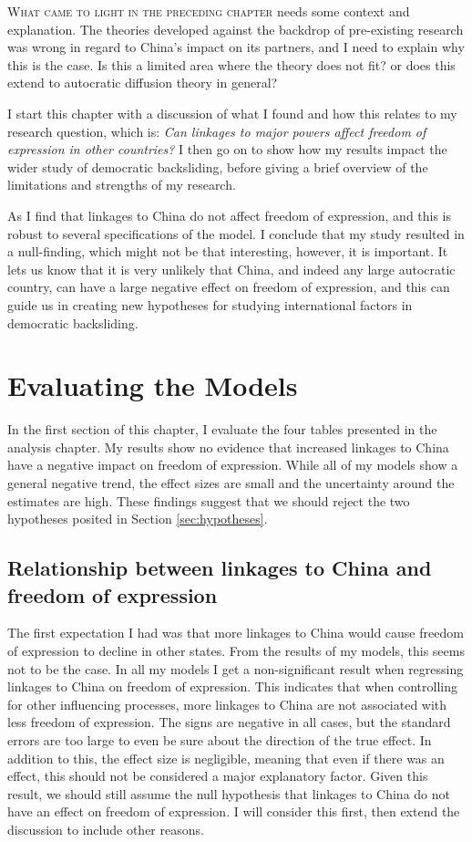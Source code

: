 \lettrine{W}{hat came to light in the preceding chapter} needs some context and explanation. The theories developed against the backdrop of pre-existing research was wrong in regard to China's impact on its partners, and I need to explain why this is the case. Is this a limited area where the theory does not fit? or does this extend to autocratic diffusion theory in general?

I start this chapter with a discussion of what I found and how this relates to my research question, which is: \textit{Can linkages to major powers affect freedom of expression in other countries?} I then go on to show how my results impact the wider study of democratic backsliding, before giving a brief overview of the limitations and strengths of my research. 

As I find that linkages to China do not affect freedom of expression, and this is robust to several specifications of the model. I conclude that my study resulted in a null-finding, which might not be that interesting, however, it is important. It lets us know that it is very unlikely that China, and indeed any large autocratic country, can have a large negative effect on freedom of expression, and this can guide us in creating new hypotheses for studying international factors in democratic backsliding. 

\section{Evaluating the Models}
In the first section of this chapter, I evaluate the four tables presented in the analysis chapter. My results show no evidence that increased linkages to China have a negative impact on freedom of expression. While all of my models show a general negative trend, the effect sizes are small and the uncertainty around the estimates are high. These findings suggest that we should reject the two hypotheses posited in Section \ref{sec:hypotheses}.

\subsection{Relationship between linkages to China and freedom of expression}
The first expectation I had was that more linkages to China would cause freedom of expression to decline in other states. From the results of my models, this seems not to be the case. In all my models  I get a non-significant result when regressing linkages to China on freedom of expression. This indicates that when controlling for other influencing processes, more linkages to China are not associated with less freedom of expression. The signs are negative in all cases, but the standard errors are too large to even be sure about the direction of the true effect. In addition to this, the effect size is negligible, meaning that even if there was an effect, this should not be considered a major explanatory factor. Given this result, we should still assume the null hypothesis that linkages to China do not have an effect on freedom of expression. I will consider this first, then extend the discussion to include other reasons. 

